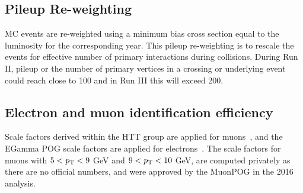 

\subsection{Pileup Re-weighting}

MC events are re-weighted using a minimum bias cross section equal to the luminosity for the corresponding year. This pileup re-weighting is to rescale the events for effective number of primary interactions during collisions. During Run II, pileup or the number of primary vertices in a crossing or underlying event could reach close to 100 and in Run III this will exceed 200.   

\subsection{Electron and muon identification efficiency}

Scale factors derived within the HTT group are applied for muons~\cite{AN16355}, and the EGamma POG scale factors are applied for electrons~\cite{EGammaMVAID}. The scale factors for muons with $5<p_{\mathrm{T}}<9$ GeV and $9<p_{\mathrm{T}}<10$ GeV, are computed privately as there are no official numbers, and were approved by the MuonPOG in the 2016 analysis. 
  

